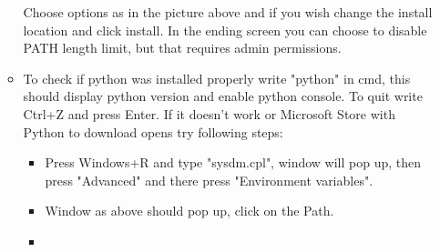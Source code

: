 \documentclass[a4paper,12pt]{article}
\begin{document}
\begin{enumerate}
\begin{itemize}
\begin{minipage}[t]{\linewidth}
{			}		
			\medskip	
		\end{minipage}
		Choose options as in the picture above and if you wish change the install location and click install. In the ending screen you can choose to disable PATH length limit, but that requires admin permissions.
		\item To check if python was installed properly write "python" in cmd, this should display python version and enable python console. To quit write Ctrl+Z and press Enter. If it doesn't work or Microsoft Store with Python to download opens try following steps:
		\begin{itemize}
			\item Press Windows+R and type "sysdm.cpl", window will pop up, then press "Advanced" and there press "Environment variables".
			\item \begin{minipage}[t]{\linewidth}
				\raggedright
				\medskip	
			\end{minipage}
			Window as above should pop up, click on the Path.
			\item \begin{minipage}[t]{\linewidth}
				\raggedright
\end{minipage}
\end{itemize}
\end{itemize}
\end{enumerate}
\end{document}
